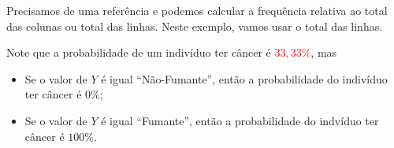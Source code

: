\documentclass[
  10pt,
  ignorenonframetext,
]{beamer}
\begin{document}
\begin{frame}
Precisamos de uma referência e podemos calcular a frequência relativa ao
total das colunas ou total das linhas. Neste exemplo, vamos usar o total
das linhas.

\begin{table}[htbp]
    \centering
    \caption{Tabela de contingência com frequência relativa ao total das linhas.}
    
\end{table}

Note que a probabilidade de um indivíduo ter câncer é
\textcolor{red}{  $33,33\%$}, mas

\begin{itemize}
    \item Se o valor de $Y$ é igual ``Não-Fumante'', então a probabilidade do indivíduo ter câncer é {\color{brown} $0\%$};
    \item Se o valor de $Y$ é igual ``Fumante'', então a probabilidade do indvíduo ter câncer é {\color{blue} $100\%$}.
\end{itemize}
\end{frame}
\end{document}
